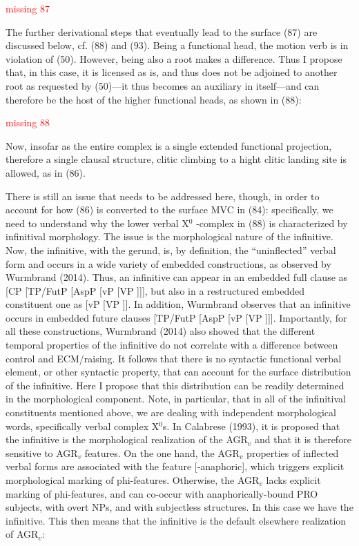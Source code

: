 \documentclass[output=paper,colorlinks,citecolor=brown,
]{langscibook}
\begin{document}
\ea
\textcolor{red}{missing 87}
\z

The further derivational steps that eventually lead to the surface (87) are discussed below, cf. (88) and (93).  Being a functional head, the motion verb is in violation of (50).  However, being also a root makes a difference.  Thus I propose that, in this case, it is licensed as is, and thus does not be adjoined to another root as requested by (50)—it thus becomes an auxiliary in itself—and can therefore be the host of the higher functional heads, as shown in (88):  

\ea
\textcolor{red}{missing 88}
\z

Now, insofar as the entire complex is a single extended functional projection, therefore a single clausal structure, clitic climbing to a hight clitic landing site is allowed, as in (86). 

There is still an issue that needs to be addressed here, though, in order to account for how (86) is converted to the surface MVC in (84): specifically, we need to understand why the lower verbal X$^0$ -complex in (88) is characterized by infinitival morphology. The issue is the morphological nature of the infinitive. Now, the infinitive, with the gerund, is, by definition, the “uninflected” verbal form and occurs in a wide variety of embedded constructions, as observed by Wurmbrand (2014).  Thus, an infinitive can appear in an embedded full clause as [CP [TP/FutP [AspP [vP [VP ]]], but also in a restructured embedded constituent one as [vP [VP ]].  In addition, Wurmbrand observes that an infinitive occurs in embedded future clauses  [TP/FutP [AspP [vP [VP ]]]. Importantly, for all these constructions, Wurmbrand (2014) also showed that the different temporal properties of the infinitive do not correlate with a difference between control and ECM/raising. It follows that there is no syntactic functional verbal element, or other syntactic property, that can account for the surface distribution of the infinitive. Here I propose that this distribution can be readily determined in the morphological component. Note, in particular, that in all of the infinitival constituents mentioned above, we are dealing with independent morphological words, specifically verbal complex X$^0$s. In Calabrese (1993), it is proposed that the infinitive is the morphological realization of the  AGR$_v$ and that it is therefore sensitive to  AGR$_v$ features. On the one hand, the  AGR$_v$ properties of inflected verbal forms are associated with the feature [-anaphoric], which triggers explicit morphological marking of phi-features.  Otherwise, the  AGR$_v$ lacks explicit marking of phi-features, and can co-occur with anaphorically-bound PRO subjects, with overt NPs, and with subjectless structures. In this case we have the infinitive. This then means that the infinitive is the default elsewhere realization of  AGR$_v$:
\end{document}
